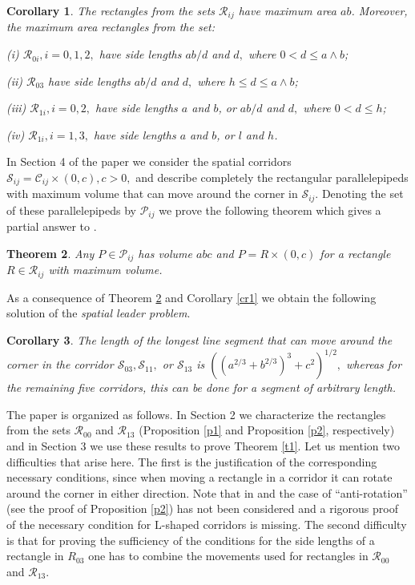 \documentclass[12pt]{amsart}
\newtheorem{thm}{Theorem}
\newtheorem{cor}[thm]{Corollary}
\def\C{\mathcal C}
\def\R{\mathcal R}
\def\P{\mathcal P}
\def\S{\mathcal S}
\def\s{\smallskip}
\def\w{\wedge}
\begin{document}
\s

\begin{cor} \label{cr2}  The rectangles from the sets  $\R_{ij}$ have maximum area $ab$.
Moreover, the maximum area rectangles from the set:


(i) $\R_{0i} , i=0,1,2,$ have side lengths $ab/d$ and $d,$ where
$0<d\le a\w b$;

(ii) $\R_{03}$ have side lengths $ab/d$ and $d,$ where $h\le d\le
a\w b $;

(iii) $\R_{1i} , i=0,2,$ have side lengths $a$ and $b$, or $ab/d$
and $d,$ where  $0<d\le h$;


(iv) $\R_{1i} , i=1,3, $ have side lengths $a$ and $b$, or $l$ and
$h$.
\end{cor}

In Section 4 of the paper we consider the spatial corridors
$\S_{ij}=\C_{ij}\times (0,c) , c>0,$ and describe completely the
rectangular parallelepipeds  with maximum volume that can move
around the corner in $\S_{ij}$. Denoting the set of these
parallelepipeds by $\P_{ij}$ we prove the  following theorem which
gives a partial answer to \cite[Question 4, p. 200]{Mo}.

\begin{thm} \label{t2} Any $P\in
\P_{ij}$ has volume $abc$ and $P=R\times (0,c)$ for a rectangle
$R\in \R_{ij}$ with maximum volume.
\end{thm}

As a consequence of Theorem \ref{t2} and Corollary \ref{cr1} we
obtain the following solution of the \emph{spatial leader
problem}.

\begin{cor} \label{cr3} The length of the longest line segment that can move
around the corner in the corridor $\S_{03} , \S_{11} ,$ or
$\S_{13}$ is $((a^{2/3}+b^{2/3})^{3}+c^2)^{1/2},$ whereas for
the remaining five corridors, this can be done for a segment of
arbitrary length.
\end{cor}

The paper is organized as follows. In Section 2 we characterize
the rectangles from the sets $\R_{00}$ and $\R_{13}$ (Proposition
\ref{p1} and Proposition \ref{p2}, respectively) and in Section 3
we use these results to prove Theorem \ref{t1}. Let us mention two
difficulties that arise here. The first is the justification of
the corresponding necessary conditions, since when moving a
rectangle in a corridor it can rotate around the corner in either
direction. Note that in \cite {Mo} and \cite{Ka} the case of
``anti-rotation'' (see the proof of Proposition \ref{p2}) has not
been considered and a rigorous proof of the necessary condition
for $\mathrm{L}$-shaped corridors is missing. The second
difficulty is that for proving the sufficiency of the conditions
for the side lengths of a rectangle in $R_{03}$ one has to combine
the movements used for rectangles in $\R_{00}$ and $\R_{13}$.
\end{document}
